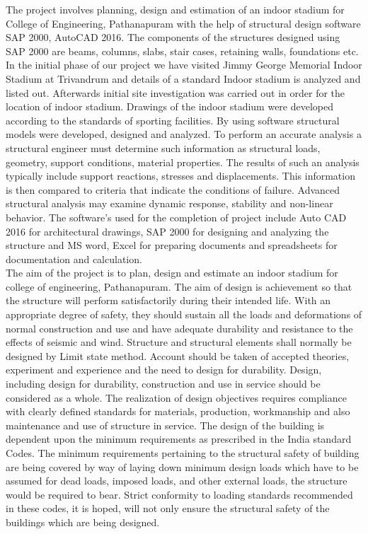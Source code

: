 The project involves planning, design and estimation of an indoor stadium for College of Engineering, Pathanapuram with the help of structural design software SAP 2000, AutoCAD 2016. The components of the structures designed using SAP 2000 are beams, columns, slabs, stair cases, retaining walls, foundations etc. In the initial phase of our project we have visited Jimmy George Memorial Indoor Stadium at Trivandrum and details of a standard Indoor stadium is analyzed and listed out. Afterwards initial site investigation was carried out in order for the location of indoor stadium. Drawings of the indoor stadium were developed according to the standards of sporting facilities.
By using software structural models were developed, designed and analyzed. To perform an accurate analysis a structural engineer must determine such information as structural loads, geometry, support conditions, material properties. The results of such an analysis typically include support reactions, stresses and displacements. This information is then compared to criteria that indicate the conditions of failure. Advanced structural analysis may examine dynamic response, stability and non-linear behavior.
The software’s used for the completion of project include Auto CAD 2016 for architectural drawings, SAP 2000 for designing and analyzing the structure and MS word, Excel for preparing documents and spreadsheets for documentation and calculation. 
\\The aim of the project is to plan, design and estimate an indoor stadium for college of engineering, Pathanapuram. The aim of design is achievement so that the structure will perform satisfactorily during their intended life. With an appropriate degree of safety, they should sustain all the loads and deformations of normal construction and use and have adequate durability and resistance to the effects of seismic and wind. Structure and structural elements shall normally be designed by Limit state method. Account should be taken of accepted theories, experiment and experience and the need to design for durability. Design, including design for durability, construction and use in service should be considered as a whole. The realization of design objectives requires compliance with clearly defined standards for materials, production, workmanship and also maintenance and use of structure in service. 
The design of the building is dependent upon the minimum requirements as prescribed in the India standard Codes. The minimum requirements pertaining to the structural safety of building are being covered by way of laying down minimum design loads which have to be assumed for dead loads, imposed loads, and other external loads, the structure would be required to bear. Strict conformity to loading standards recommended in these codes, it is hoped, will not only ensure the structural safety of the buildings which are being designed.

